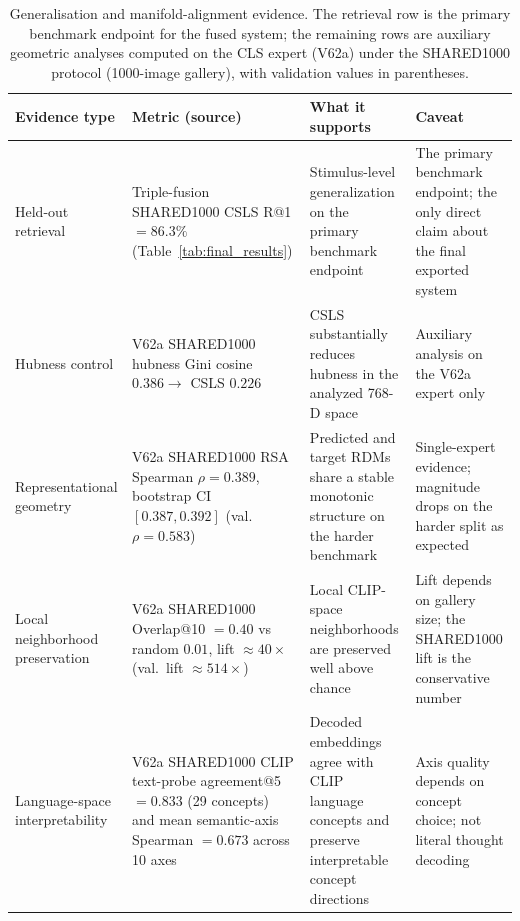 \begin{table}[htbp]
\centering
\footnotesize
\begin{tabularx}{\textwidth}{>{\raggedright\arraybackslash}p{3.0cm} >{\raggedright\arraybackslash}p{4.0cm} >{\raggedright\arraybackslash}X >{\raggedright\arraybackslash}p{3.4cm}}
\toprule
\textbf{Evidence type} & \textbf{Metric (source)} & \textbf{What it supports} & \textbf{Caveat} \\
\midrule
Held-out retrieval & Triple-fusion SHARED1000 CSLS R@1 $=86.3\%$ (Table~\ref{tab:final_results}) & Stimulus-level generalization on the primary benchmark endpoint & The primary benchmark endpoint; the only direct claim about the final exported system \\
Hubness control & V62a SHARED1000 hubness Gini cosine $0.386 \rightarrow$ CSLS $0.226$ & CSLS substantially reduces hubness in the analyzed 768-D space & Auxiliary analysis on the V62a expert only \\
Representational geometry & V62a SHARED1000 RSA Spearman $\rho = 0.389$, bootstrap CI $[0.387, 0.392]$ (val.\ $\rho = 0.583$) & Predicted and target RDMs share a stable monotonic structure on the harder benchmark & Single-expert evidence; magnitude drops on the harder split as expected \\
Local neighborhood preservation & V62a SHARED1000 Overlap@10 $= 0.40$ vs random $0.01$, lift $\approx 40\times$ (val.\ lift $\approx 514\times$) & Local CLIP-space neighborhoods are preserved well above chance & Lift depends on gallery size; the SHARED1000 lift is the conservative number \\
Language-space interpretability & V62a SHARED1000 CLIP text-probe agreement@5 $= 0.833$ (29 concepts) and mean semantic-axis Spearman $= 0.673$ across 10 axes & Decoded embeddings agree with CLIP language concepts and preserve interpretable concept directions & Axis quality depends on concept choice; not literal thought decoding \\
\bottomrule
\end{tabularx}
\caption{Generalisation and manifold-alignment evidence. The retrieval row is the primary benchmark endpoint for the fused system; the remaining rows are auxiliary geometric analyses computed on the CLS expert (V62a) under the SHARED1000 protocol (1000-image gallery), with validation values in parentheses.}
\label{tab:manifold_evidence}
\end{table}


